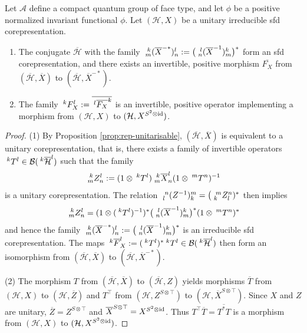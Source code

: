 \begin{Prop} \label{prop:rep-f}
  Let $\mathscr{A}$ define a compact quantum group of face type, and let $\phi$ be a positive normalized
  invariant functional $\phi$. Let $(\mathcal{H},X)$ be a unitary
  irreducible sfd corepresentation. 
  \begin{enumerate}
  \item The conjugate $\overline{\mathcal{H}}$ with the family
    $\Gr{(\overline{X}^{-*})}{k}{l}{m}{n}:=\big(\Gr{(\overline{X}^{-1})}{l}{k}{n}{m}\big)^{*}$
    form an sfd corepresentation, and there
    exists an invertible, positive morphism $\overline{F_{X}}$ from
    $(\overline{\mathcal{H}},\overline{X})$ to
    $(\overline{\mathcal{H}},\overline{X}^{-*})$. %
  \item The family
    $\Gru{F_{X}}{k}{l}:=\overline{\Gru{\overline{F_{X}}}{l}{k}}$ is an
    invertible, positive operator implementing a morphism from $(\mathcal{H},X)$ to
    $(\mathcal{H},X^{S^{2} \otimes \id})$.
  \end{enumerate}
\end{Prop}
\begin{proof}
(1) By Proposition \ref{prop:rep-unitarisable},
$(\overline{\mathcal{H}},\overline{X})$ is equivalent to a unitary
corepresentation, that is, there exists a family of invertible operators
$\Gru{T}{k}{l} \in \mathcal{B}(\Gru{\overline{\mathcal{H}}}{k}{l})$
such that the family 
\begin{align*}
\Gr{Z}{k}{l}{m}{n}:= (1 \otimes
\Gru{T}{k}{l})\Gr{\overline{X}}{k}{l}{m}{n}(1 \otimes
\Gru{T}{m}{n})^{-1} 
\end{align*}
 is a unitary corepresentation. The relation
 $\Gr{(Z^{-1})}{n}{m}{l}{k}=\big(\Gr{Z}{m}{n}{k}{l})^{*}$ then implies
 \begin{align*}
   \Gr{Z}{k}{l}{m}{n} = (1 \otimes
   (\Gru{T}{k}{l})^{-1})^{*}\big(\Gr{(\overline{X}^{-1})}{l}{k}{n}{m}\big)^{*}(1
   \otimes \Gru{T}{m}{n})^{*}
 \end{align*}
 and hence the family 
 $\Gr{(\overline{X}^{-*})}{k}{l}{m}{n}:=\big(\Gr{(\overline{X}^{-1})}{l}{k}{n}{m}\big)^{*}$
 is an irreducible sfd corepresentation. The maps
 $\Gru{\overline{F}_{X}}{k}{l}:=(\Gru{T}{k}{l})^{*}\Gru{T}{k}{l} \in
  \mathcal{B}(\Gru{\overline{\mathcal{H}}}{k}{l})$
then form an isomorphism from $(\overline{\mathcal{H}},\overline{X})$ to
$(\overline{\mathcal{H}},\overline{X}^{-*})$.   

(2) The morphism $T$  from $(\overline{\mathcal{H}},\overline{X})$  to
$(\overline{\mathcal{H}},Z)$ yields morphisms $\overline{T}$ from
$(\mathcal{H},X)$ to $(\mathcal{H},\overline{Z})$ and $T^{\top}$ from $(\mathcal{H},Z^{S\otimes\top})$ to
$(\mathcal{H},\overline{X}^{S \otimes \top})$. Since $X$ and $Z$ are
unitary, $\overline{Z}=Z^{S\otimes \top}$ and  $\overline{X}^{S \otimes
  \top} = X^{S^{2} \otimes \id}$. Thus $T^{\top}\overline{T} =
\overline{T^{*}T}$ is a morphism from $(\mathcal{H},X)$ to
$(\mathcal{H},X^{S^{2}\otimes \id})$.
\end{proof}


